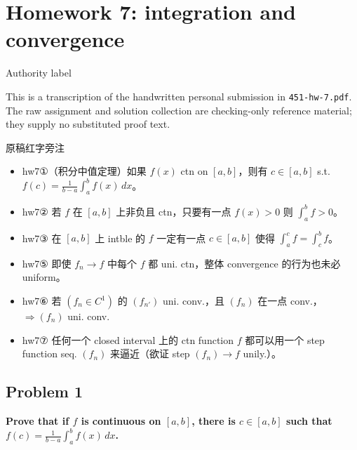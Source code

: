 \chapter{Homework 7: integration and convergence}

\begin{qlremark}{Authority label}

This is a transcription of the handwritten personal submission in \texttt{451-hw-7.pdf}. The raw assignment and solution collection are checking-only reference material; they supply no substituted proof text.

\end{qlremark}

\begin{qlremark}{原稿红字旁注}

\begin{itemize}
\tightlist
\item
  hw7①（积分中值定理）如果 \(f(x)\) ctn on \(\left\lbrack {a,b} \right\rbrack\)，则有 \(c \in \left\lbrack {a,b} \right\rbrack\) s.t. \(f(c) = \frac{1}{b - a}\int_{a}^{b}f(x)\, dx\)。
\item
  hw7② 若 \(f\) 在 \(\left\lbrack {a,b} \right\rbrack\) 上非负且 ctn，只要有一点 \(f(x) > 0\) 则 \(\int_{a}^{b}f > 0\)。
\item
  hw7③ 在 \(\left\lbrack {a,b} \right\rbrack\) 上 intble 的 \(f\) 一定有一点 \(c \in \left\lbrack {a,b} \right\rbrack\) 使得 \(\int_{a}^{c}f = \int_{c}^{b}f\)。
\item
  hw7⑤ 即使 \(f_{n}\rightarrow f\) 中每个 \(f\) 都 uni. ctn，整体 convergence 的行为也未必 uniform。
\item
  hw7⑥ 若 \(\left( {f_{n} \in C^{1}} \right)\) 的 \(\left( f_{n'} \right)\) uni. conv.，且 \(\left( f_{n} \right)\) 在一点 conv.，\(\Rightarrow\left( f_{n} \right)\) uni. conv.
\item
  hw7⑦ 任何一个 closed interval 上的 ctn function \(f\) 都可以用一个 step function seq. \(\left( f_{n} \right)\) 来逼近（欲证 step \(\left( f_{n} \right)\rightarrow f\) unily.）。
\end{itemize}

\end{qlremark}

\section{Problem 1}

\textbf{Prove that if \(f\) is continuous on \(\left\lbrack {a,b} \right\rbrack\), there is \(c \in \left\lbrack {a,b} \right\rbrack\) such that \(f(c) = \frac{1}{b - a}\int_{a}^{b}f(x)\, dx\).}

